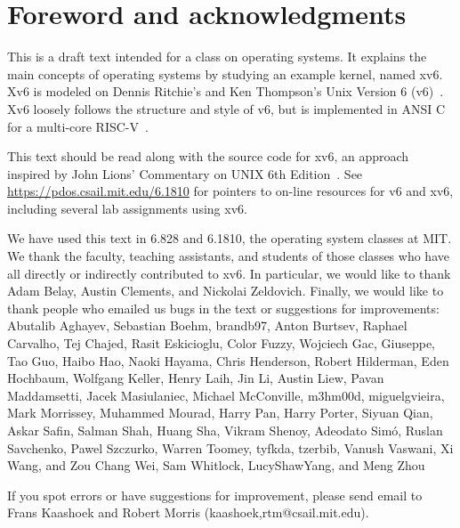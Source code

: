\chapter*{Foreword and acknowledgments}


This is a draft text intended for a class on operating systems. It
explains the main concepts of operating systems by studying an example
kernel, named xv6.  Xv6 is modeled on Dennis Ritchie's and
Ken Thompson's Unix Version 6 (v6)~\cite{unix}.  Xv6 loosely follows the structure
and style of v6, but is implemented in ANSI C~\cite{kernighan} for 
a multi-core RISC-V~\cite{riscv}.

This text should be read along with the source code for xv6, an approach 
inspired by John Lions' Commentary on UNIX 6th Edition~\cite{lions}. See
\url{https://pdos.csail.mit.edu/6.1810} for pointers to on-line
resources for v6 and xv6, including several lab assignments
using xv6.

We have used this text in 6.828 and 6.1810, the operating system
classes at MIT.  We thank the faculty, teaching assistants, and
students of those classes who have all directly or indirectly
contributed to xv6.  In particular, we would like to thank Adam Belay,
Austin Clements, and Nickolai Zeldovich.  Finally, we would like to
thank people who emailed us bugs in the text or suggestions for
improvements: Abutalib Aghayev, Sebastian Boehm, brandb97, Anton
Burtsev, Raphael Carvalho, Tej Chajed, Rasit Eskicioglu, Color Fuzzy,
Wojciech Gac, Giuseppe, Tao Guo, Haibo Hao, Naoki Hayama, Chris
Henderson, Robert Hilderman, Eden Hochbaum, Wolfgang Keller, Henry
Laih, Jin Li, Austin Liew, Pavan Maddamsetti, Jacek Masiulaniec,
Michael McConville, m3hm00d, miguelgvieira, Mark Morrissey, Muhammed
Mourad, Harry Pan, Harry Porter, Siyuan Qian, Askar Safin, Salman
Shah, Huang Sha, Vikram Shenoy,  Adeodato Simó, Ruslan Savchenko, Pawel Szczurko,
Warren Toomey, tyfkda, tzerbib, Vanush Vaswani, Xi Wang, and Zou Chang
Wei, Sam Whitlock, LucyShawYang, and Meng Zhou

If you spot errors or have suggestions for improvement, please send email to
Frans Kaashoek and Robert Morris (kaashoek,rtm@csail.mit.edu).
